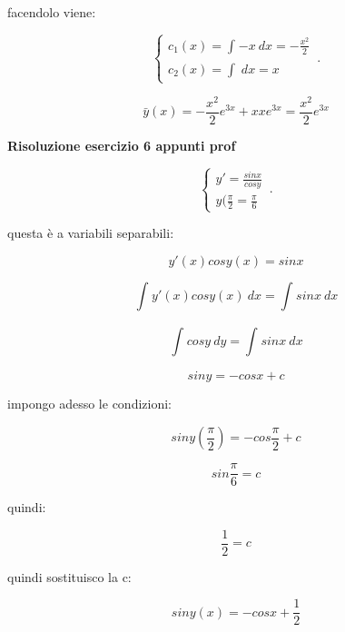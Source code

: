 \documentclass[../appunti-analisi.tex]{subfiles}
\begin{document}

facendolo viene:

    \begin{equation}
        \begin{cases}
            c_1(x) = \int_{}^{} {-x} \: dx =-\frac{x^{2}}{2}\\
            c_2(x) = \int_{}^{} {} \: dx  = x
        \end{cases}\,.
    \end{equation}

\[
    \bar{y} (x) = - \frac{x^{2}}{2}e ^{3x} + x x e ^{3x} = \frac{x^{2}}{2}e ^{3x}
\]


\textbf{Risoluzione esercizio 6 appunti prof} 

    \begin{equation}
        \begin{cases}
            y'= \frac{sinx}{cosy}\\
            y( \frac{\pi}{2} = \frac{\pi}{6}
        \end{cases}\,.
    \end{equation}

questa è a variabili separabili:

\[
    y'(x) cosy(x) = sinx
\]

\[
    \int_{}^{} {y'(x) cosy(x)} \: dx = \int_{}^{} {sinx} \: dx 
\]

\[
    \int_{}^{} {cosy} \: dy = \int_{}^{} {sinx} \: dx 
\]

\[
    sin y = -cos x +c
\]

impongo adesso le condizioni:

\[
    sin y( \frac{\pi}{2}) = - cos \frac{\pi}{2} + c
\]

\[
    sin \frac{\pi}{6} = c
\]

quindi:

\[
    \frac{1}{2}=c
\]

quindi sostituisco la c:

\[
    sin y(x) = - cos x + \frac{1}{2}
\]
\end{document}
